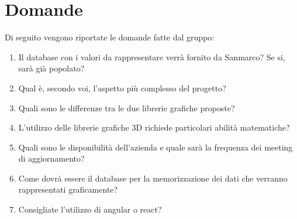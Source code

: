 \documentclass[a4paper, 12pt]{article}
\begin{document}
\section{Domande}
Di seguito vengono riportate le domande fatte dal gruppo:
\begin{enumerate}
    \item  Il database con i valori da rappresentare verrà fornito da Sanmarco? Se si, sarà già popolato?
    \item Qual è, secondo voi, l’aspetto più complesso del progetto?
    \item Quali sono le differenze tra le due librerie grafiche proposte?
    \item L’utilizzo delle librerie grafiche 3D richiede particolari abilità matematiche?
    \item Quali sono le disponibilità dell’azienda e quale sarà la frequenza dei meeting di aggiornamento?
    \item  Come dovrà essere il database per la memorizzazione dei dati che verranno rappresentati graficamente?
    \item  Consigliate l’utilizzo di angular o react?
\end{enumerate}
\end{document}
